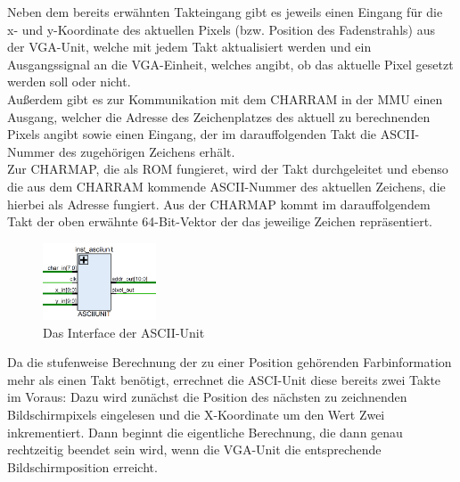 Neben dem bereits erw\"ahnten Takteingang gibt es jeweils einen Eingang f\"ur die x- und y-Koordinate des aktuellen Pixels (bzw. Position des Fadenstrahls) aus der VGA-Unit, welche mit jedem Takt aktualisiert werden und ein Ausgangssignal an die VGA-Einheit, welches angibt, ob das aktuelle Pixel gesetzt werden soll oder nicht.\\ Au{\ss}erdem gibt es zur Kommunikation mit dem CHARRAM in der MMU einen Ausgang, welcher die Adresse des Zeichenplatzes des aktuell zu berechnenden Pixels angibt sowie einen Eingang, der im darauffolgenden Takt die ASCII-Nummer des zugeh\"origen Zeichens erh\"alt.\\
Zur CHARMAP, die als ROM fungieret, wird der Takt durchgeleitet und ebenso die aus dem CHARRAM kommende ASCII-Nummer des aktuellen Zeichens, die hierbei als Adresse fungiert. Aus der CHARMAP kommt im darauffolgendem Takt der oben erw\"ahnte 64-Bit-Vektor der das jeweilige Zeichen repr\"asentiert.

\begin{figure}[H]
	\centering
	\label{fig:interface}
		\includegraphics[width=0.3\textwidth]{Asciiunit.png}
	\caption[Interface der ASCII-Unit]{Das Interface der ASCII-Unit}
\end{figure}


Da die stufenweise Berechnung der zu einer Position geh\"orenden Farbinformation mehr als einen Takt ben\"otigt, errechnet die ASCI-Unit diese bereits zwei Takte im Voraus: Dazu wird zun\"achst die Position des n\"achsten zu zeichnenden Bildschirmpixels eingelesen und die X-Koordinate um den Wert Zwei inkrementiert. Dann beginnt die eigentliche Berechnung, die dann genau rechtzeitig beendet sein wird, wenn die VGA-Unit die entsprechende Bildschirmposition erreicht.

